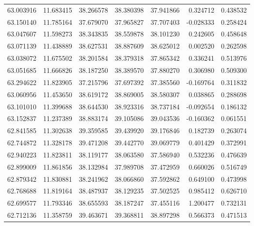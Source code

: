 \begin{tabular}{rrrrrrr}
 63.003916 &  11.683415 &         38.266578 &         38.380398 &         37.941866 &  0.324712 &  0.438532 \\
 63.150140 &  11.785164 &         37.679070 &         37.965827 &         37.707403 & -0.028333 &  0.258424 \\
 63.047607 &  11.598273 &         38.343835 &         38.559878 &         38.101230 &  0.242605 &  0.458648 \\
 63.071139 &  11.438889 &         38.627531 &         38.887609 &         38.625012 &  0.002520 &  0.262598 \\
 63.038072 &  11.675502 &         38.201584 &         38.379318 &         37.865342 &  0.336241 &  0.513976 \\
 63.051685 &  11.666826 &         38.187250 &         38.389570 &         37.880270 &  0.306980 &  0.509300 \\
 63.294622 &  11.823905 &         37.215796 &         37.697392 &         37.385560 & -0.169764 &  0.311832 \\
 63.060956 &  11.453650 &         38.619172 &         38.869005 &         38.580307 &  0.038865 &  0.288698 \\
 63.101010 &  11.399688 &         38.644530 &         38.923316 &         38.737184 & -0.092654 &  0.186132 \\
 63.152837 &  11.237389 &         38.883174 &         39.105086 &         39.043536 & -0.160362 &  0.061551 \\
 62.841585 &  11.302638 &         39.359585 &         39.439920 &         39.176846 &  0.182739 &  0.263074 \\
 62.744872 &  11.328178 &         39.471208 &         39.442770 &         39.069779 &  0.401429 &  0.372991 \\
 62.940223 &  11.823811 &         38.119177 &         38.063580 &         37.586940 &  0.532236 &  0.476639 \\
 62.899009 &  11.861856 &         38.132984 &         37.989708 &         37.472959 &  0.660026 &  0.516749 \\
 62.879342 &  11.830881 &         38.241962 &         38.066860 &         37.592862 &  0.649100 &  0.473998 \\
 62.768688 &  11.819164 &         38.487937 &         38.129235 &         37.502525 &  0.985412 &  0.626710 \\
 62.699577 &  11.793346 &         38.655593 &         38.187247 &         37.455116 &  1.200477 &  0.732131 \\
 62.712136 &  11.358759 &         39.463671 &         39.368811 &         38.897298 &  0.566373 &  0.471513 \\

\end{tabular}
